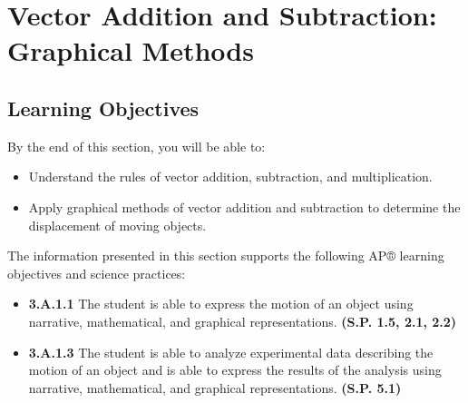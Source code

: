 \documentclass[
]{book}
\providecommand{\tightlist}{%
  \setlength{\itemsep}{0pt}\setlength{\parskip}{0pt}}
\newenvironment{learning-objectives}{}{}
\begin{document}
\hypertarget{vector-addition-and-subtraction-graphical-methods}{%
\section{Vector Addition and Subtraction: Graphical Methods}\label{vector-addition-and-subtraction-graphical-methods}}

\hypertarget{fs-id2265665}{}
\begin{learning-objectives}

\hypertarget{learning-objectives-9}{%
\subsection{Learning Objectives}\label{learning-objectives-9}}

By the end of this section, you will be able to:

\begin{itemize}
\tightlist
\item
  Understand the rules of vector addition, subtraction, and
  multiplication.
\item
  Apply graphical methods of vector addition and subtraction to
  determine the displacement of moving objects.
\end{itemize}

The information presented in this section supports the following AP®
learning objectives and science practices:

\begin{itemize}
\tightlist
\item
  \textbf{3.A.1.1} The student is able to express the motion of an object
  using narrative, mathematical, and graphical representations.
  \textbf{(S.P. 1.5, 2.1, 2.2)}
\item
  \textbf{3.A.1.3} The student is able to analyze experimental data
  describing the motion of an object and is able to express the
  results of the analysis using narrative, mathematical, and graphical
  representations. \textbf{(S.P. 5.1)}
\end{itemize}

\end{learning-objectives}
\end{document}

